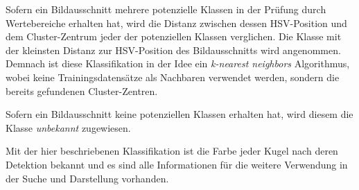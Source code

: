 Sofern ein Bildausschnitt mehrere potenzielle Klassen in der Prüfung durch Wertebereiche erhalten hat, wird die Distanz
zwischen dessen HSV-Position und dem Cluster-Zentrum jeder der potenziellen Klassen verglichen.
Die Klasse mit der kleinsten Distanz zur HSV-Position des Bildausschnitts wird angenommen.
Demnach ist diese Klassifikation in der Idee ein \emph{k-nearest neighbors} Algorithmus\cite{wiki:k_nearest_neighbors},
wobei keine Trainingsdatensätze als Nachbaren verwendet werden, sondern die bereits gefundenen Cluster-Zentren.

Sofern ein Bildausschnitt keine potenziellen Klassen erhalten hat, wird diesem die Klasse \emph{unbekannt} zugewiesen.

Mit der hier beschriebenen Klassifikation ist die Farbe jeder Kugel nach deren Detektion bekannt und es
sind alle Informationen für die weitere Verwendung in der Suche und Darstellung vorhanden.

